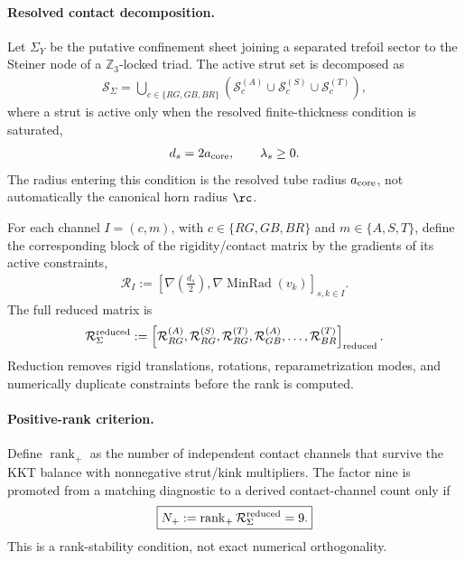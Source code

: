 \paragraph{Resolved contact decomposition.}
Let \(\Sigma_Y\) be the putative confinement sheet joining a separated trefoil
sector to the Steiner node of a \(\mathbb Z_3\)-locked triad.  The active strut set
is decomposed as
\begin{align}
    \mathcal S_{\Sigma}
    =
    \bigcup_{c\in\{RG,GB,BR\}}
    \left(
        \mathcal S_{c}^{(A)}
        \cup
        \mathcal S_{c}^{(S)}
        \cup
        \mathcal S_{c}^{(T)}
    \right),
    \label{eq:rt_colored_strut_decomposition}
\end{align}
where a strut is active only when the resolved finite-thickness condition is
saturated,
\begin{align}
    d_s=2a_{\rm core},
    \qquad
    \lambda_s\ge0.
    \label{eq:rt_rank9_active_strut_condition}
\end{align}
The radius entering this condition is the resolved tube radius
\(a_{\rm core}\), not automatically the canonical horn radius \(\rc\).

For each channel \(I=(c,m)\), with
\(c\in\{RG,GB,BR\}\) and \(m\in\{A,S,T\}\), define the corresponding block of the
rigidity/contact matrix by the gradients of its active constraints,
\begin{align}
    \mathcal R_I
    :=
    \left[
        \nabla\!\left(\frac{d_s}{2}\right),
        \nabla\operatorname{MinRad}(v_k)
    \right]_{s,k\in I}.
    \label{eq:rt_rank9_channel_block}
\end{align}
The full reduced matrix is
\begin{align}
    \mathcal R_{\Sigma}^{\rm reduced}
    :=
    \left[\mathcal R_{RG}^{(A)},\mathcal R_{RG}^{(S)},\mathcal R_{RG}^{(T)},
    \mathcal R_{GB}^{(A)},\ldots,
    \mathcal R_{BR}^{(T)}\right]_{\rm reduced}.
    \label{eq:rt_rank9_reduced_matrix}
\end{align}
Reduction removes rigid translations, rotations, reparametrization modes, and
numerically duplicate constraints before the rank is computed.

\paragraph{Positive-rank criterion.}
Define \(\operatorname{rank}_{+}\) as the number of independent contact channels
that survive the KKT balance with nonnegative strut/kink multipliers.  The
factor nine is promoted from a matching diagnostic to a derived contact-channel
count only if
\begin{align}
    \boxed{
    N_{+}
    :=
    \operatorname{rank}_{+}
    \mathcal R_{\Sigma}^{\rm reduced}
    =9 .
    }
    \label{eq:rt_rank9_positive_rank_condition}
\end{align}
This is a rank-stability condition, not exact numerical orthogonality.

